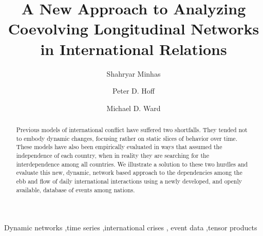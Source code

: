 \documentclass[3p,times,twocolumn,authoryear,12pt]{elsarticle}
\begin{document}
\begin{frontmatter}



\title{A New Approach to Analyzing Coevolving Longitudinal Networks in International Relations}


\author[duke]{Shahryar Minhas}
\author[UW]{Peter D. Hoff}
\author[duke]{Michael D. Ward}
\address[duke]{Department of Political Science, Duke University, Durham, NC 27701, USA}
\address[UW]{Departments of Biostatistics \& Statistics, University of Washington, Seattle, WA, USA}


\begin{abstract}
Previous models of international conflict have suffered two shortfalls. They tended not to embody dynamic changes, focusing rather on static slices of behavior over time. These models have also been empirically evaluated in ways that assumed the independence of each country, when in reality they are searching for the interdependence among all countries. We illustrate a solution to these two hurdles and evaluate this new, dynamic, network based approach to the dependencies among the ebb and flow of daily international interactions using a newly developed, and openly available, database of events among nations. 

\end{abstract}

\begin{keyword}
Dynamic networks \sep time series \sep international crises \sep 
event data \sep tensor products
\end{keyword}

\end{frontmatter}
\end{document}
